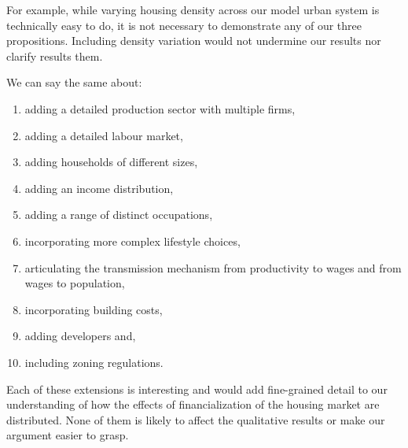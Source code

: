 For example, %
while varying housing density across our model urban system is technically easy to do, it is not necessary to demonstrate any of our three propositions. Including density variation would not undermine our results nor clarify results them. %

We can say the same about: 
\begin{enumerate}
    \item adding a detailed production sector with multiple firms,
    \item adding a detailed labour market,
    \item adding households of different sizes,
    \item adding an income distribution,
    \item adding a range of distinct occupations,
    \item incorporating more complex lifestyle choices,
    \item articulating the transmission mechanism from productivity to wages and from wages to population,
    \item incorporating building costs, 
    \item adding developers and,
    \item including zoning regulations. 
\end{enumerate}


Each of these extensions is interesting and would add fine-grained detail to our understanding of how the effects of financialization of the housing market are distributed. None of them is likely to affect the qualitative results or make our argument easier to grasp.
